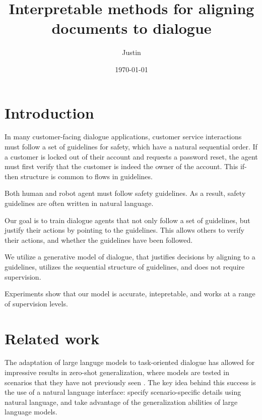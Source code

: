\documentclass[12pt]{article}
\title{Interpretable methods for aligning documents to dialogue}
\author{Justin}
\date{\today}
\begin{document}
\maketitle

\section{Introduction}
In many customer-facing dialogue applications,
customer service interactions must follow a set of guidelines for safety,
which have a natural sequential order.
If a customer is locked out of their account and requests a password reset,
the agent must first verify that the customer is indeed the owner of the account.
This if-then structure is common to flows in guidelines.

Both human and robot agent must follow safety guidelines.
As a result, safety guidelines are often written in natural language.

Our goal is to train dialogue agents that not only follow a set of guidelines,
but justify their actions by pointing to the guidelines.
This allows others to verify their actions, and whether the guidelines have been followed.

We utilize a generative model of dialogue,
that justifies decisions by aligning to a guidelines,
utilizes the sequential structure of guidelines,
and does not require supervision.

Experiments show that our model is accurate,
intepretable,
and works at a range of supervision levels.

\section{Related work}
The adaptation of large languge models to task-oriented dialogue
has allowed for impressive results in zero-shot generalization,
where models are tested in scenarios that they have not previously seen
\cite{}.
The key idea behind this success is the use of a natural language interface:
specify scenario-specific details using natural language,
and take advantage of the generalization abilities of large language models.
\end{document}

